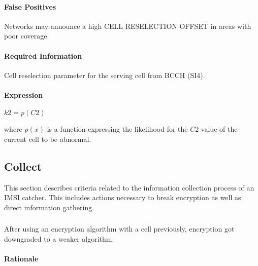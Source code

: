 \documentclass[a4paper,11pt,notitlepage,bigheadings,oneside]{scrartcl}
\begin{document}
\paragraph{False Positives}

Networks may announce a high CELL RESELECTION OFFSET in areas with poor
coverage.


\paragraph{Required Information}

Cell reselection parameter for the serving cell from BCCH (SI4).

\paragraph{Expression}

$k2 = p(C2)$

where $p(x)$ is a function expressing the likelihood for the $C2$ value of the
current cell to be abnormal.


\subsection{Collect}

This section describes criteria related to the information collection process
of an IMSI catcher. This includes actions necessary to break encryption as well
as direct information gathering.

\subsubsection{}

After using an encryption algorithm with a cell previously, encryption got
downgraded to a weaker algorithm.

\paragraph{Rationale}
\end{document}
